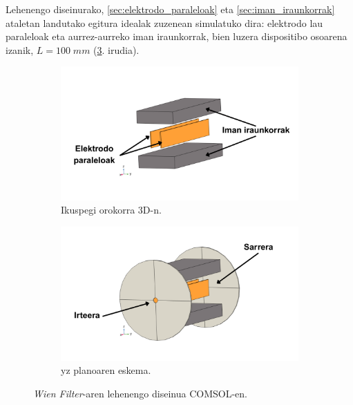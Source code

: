 \documentclass[12pt]{article}
\numberwithin{figure}{section}
\numberwithin{equation}{section}
\begin{document}
Lehenengo diseinurako, \ref{sec:elektrodo_paraleloak} eta \ref{sec:iman_iraunkorrak} ataletan landutako egitura idealak zuzenean simulatuko dira: elektrodo lau paraleloak eta aurrez-aurreko iman iraunkorrak, bien luzera dispositibo osoarena izanik, $L=100\;mm$ (\ref{fig:wien_ideal}. irudia). 
\newpage
\begin{figure}[h]
    \centering
    \begin{subfigure}[b]{0.45\textwidth}
        \centering
        \includegraphics[width=\linewidth]{4 - Diseinua/wien_filter_ideal1.png}
        \caption{Ikuspegi orokorra 3D-n.}
        \label{fig:wien_ideal_1}
    \end{subfigure}
    \hspace{0.02\textwidth}
    \begin{subfigure}[b]{0.45\textwidth}
        \centering
        \includegraphics[width=\linewidth]{4 - Diseinua/wien_filter_ideal2.png}
        \caption{yz planoaren eskema.}
        \label{fig:wien_ideal_2}
    \end{subfigure}
    \caption{\textit{Wien Filter}-aren lehenengo diseinua COMSOL-en.}
    \label{fig:wien_ideal}
\end{figure}
\end{document}
